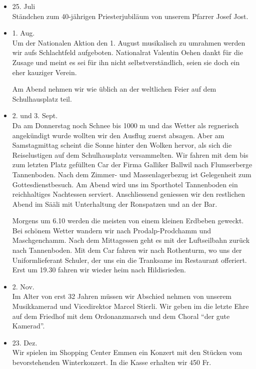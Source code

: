 \begin{history}
\begin{itemize}
        \item 25. Juli\\
              Ständchen zum 40-jährigen Priesterjubiläum von unserem Pfarrer Josef
              Jost.

        \item 1. Aug.\\
              Um der Nationalen Aktion den 1. August musikalisch zu umrahmen werden
              wir aufs Schlachtfeld aufgeboten. Nationalrat Valentin Oehen dankt für
              die Zusage und meint es sei für ihn nicht selbstverständlich, seien sie
              doch ein eher kauziger Verein.

              Am Abend nehmen wir wie üblich an der weltlichen Feier auf dem
              Schulhausplatz teil.

        \item 2. und 3. Sept.\\
              Da am Donnerstag noch Schnee bis 1000 m und das Wetter als regnerisch
              angekündigt wurde wollten wir den Ausflug zuerst absagen. Aber am
              Samstagmittag scheint die Sonne hinter den Wolken hervor, als sich die
              Reiselustigen auf dem Schulhausplatz versammelten. Wir fahren mit dem
              bis zum letzten Platz gefüllten Car der Firma Galliker Ballwil nach
              Flumserberge Tannenboden. Nach dem Zimmer- und Massenlagerbezug ist
              Gelegenheit zum Gottesdienstbesuch. Am Abend wird uns im Sporthotel
              Tannenboden ein reichhaltiges Nachtessen serviert. Anschliessend
              geniessen wir den restlichen Abend im Sääli mit Unterhaltung der
              Ronspatzen und an der Bar.

              Morgens um 6.10 werden die meisten von einem kleinen Erdbeben geweckt.
              Bei schönem Wetter wandern wir nach Prodalp-Prodchamm und Maschgenchamm.
              Nach dem Mittagessen geht es mit der Luftseilbahn zurück nach
              Tannenboden. Mit dem Car fahren wir nach Rothenturm, wo uns der
              Uniformlieferant Schuler, der uns ein die Tranksame im Restaurant
              offeriert. Erst um 19.30 fahren wir wieder heim nach Hildisrieden.

        \item 2. Nov.\\
              Im Alter von erst 32 Jahren müssen wir Abschied nehmen von unserem
              Musikkamerad und Vicedirektor Marcel Stierli. Wir geben im die letzte
              Ehre auf dem Friedhof mit dem Ordonanzmarsch und dem Choral \enquote{der gute
                  Kamerad}.

        \item 23. Dez.\\
              Wir spielen im Shopping Center Emmen ein Konzert mit den Stücken vom
              bevorstehenden Winterkonzert. In die Kasse erhalten wir 450 Fr.

    \end{itemize}

\end{history}

